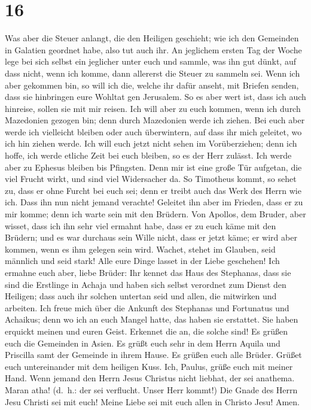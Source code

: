 \hypertarget{section-15}{%
\section{16}\label{section-15}}

 Was aber die Steuer anlangt, die den Heiligen geschieht;
wie ich den Gemeinden in Galatien geordnet habe, also tut auch ihr.
 An jeglichem ersten Tag der Woche lege bei sich selbst
ein jeglicher unter euch und sammle, was ihn gut dünkt, auf dass nicht,
wenn ich komme, dann allererst die Steuer zu sammeln sei. 
Wenn ich aber gekommen bin, so will ich die, welche ihr dafür anseht,
mit Briefen senden, dass sie hinbringen eure Wohltat gen Jerusalem.
 So es aber wert ist, dass ich auch hinreise, sollen sie
mit mir reisen.  Ich will aber zu euch kommen, wenn ich
durch Mazedonien gezogen bin; denn durch Mazedonien werde ich ziehen.
 Bei euch aber werde ich vielleicht bleiben oder auch
überwintern, auf dass ihr mich geleitet, wo ich hin ziehen werde.
 Ich will euch jetzt nicht sehen im Vorüberziehen; denn
ich hoffe, ich werde etliche Zeit bei euch bleiben, so es der Herr
zulässt.  Ich werde aber zu Ephesus bleiben bis Pfingsten.
 Denn mir ist eine große Tür aufgetan, die viel Frucht
wirkt, und sind viel Widersacher da.  So Timotheus kommt,
so sehet zu, dass er ohne Furcht bei euch sei; denn er treibt auch das
Werk des Herrn wie ich.  Dass ihn nun nicht jemand
verachte! Geleitet ihn aber im Frieden, dass er zu mir komme; denn ich
warte sein mit den Brüdern.  Von Apollos, dem Bruder,
aber wisset, dass ich ihn sehr viel ermahnt habe, dass er zu euch käme
mit den Brüdern; und es war durchaus sein Wille nicht, dass er jetzt
käme; er wird aber kommen, wenn es ihm gelegen sein wird.
 Wachet, stehet im Glauben, seid männlich und seid stark!
 Alle eure Dinge lasset in der Liebe geschehen!
 Ich ermahne euch aber, liebe Brüder: Ihr kennet das Haus
des Stephanas, dass sie sind die Erstlinge in Achaja und haben sich
selbst verordnet zum Dienst den Heiligen;  dass auch ihr
solchen untertan seid und allen, die mitwirken und arbeiten.
 Ich freue mich über die Ankunft des Stephanas und
Fortunatus und Achaikus; denn wo ich an euch Mangel hatte, das haben sie
erstattet.  Sie haben erquickt meinen und euren Geist.
Erkennet die an, die solche sind!  Es grüßen euch die
Gemeinden in Asien. Es grüßt euch sehr in dem Herrn Aquila und Priscilla
samt der Gemeinde in ihrem Hause.  Es grüßen euch alle
Brüder. Grüßet euch untereinander mit dem heiligen Kuss. 
Ich, Paulus, grüße euch mit meiner Hand.  Wenn jemand den
Herrn Jesus Christus nicht liebhat, der sei anathema. Maran atha!
(d.~h.: der sei verflucht. Unser Herr kommt!)  Die Gnade
des Herrn Jesu Christi sei mit euch!  Meine Liebe sei mit
euch allen in Christo Jesu! Amen.
